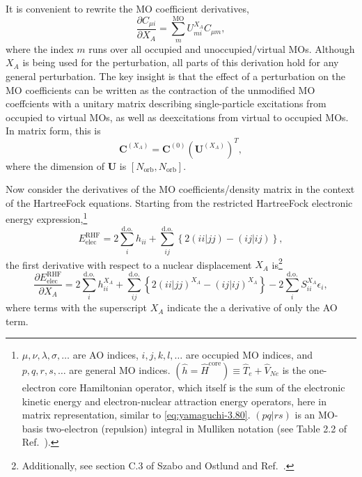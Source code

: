 \documentclass[%
class = book,%
crop = false,%
float = true,%
multi = true,%
preview = false,%
]{standalone}
\let\cite\autocite
\newcommand\hf{Hartree\textendash{}Fock}
\begin{document}
It is convenient to rewrite the MO coefficient derivatives,
\begin{equation}
  \tag{Yamaguchi eq. 3.7}
  \frac{\partial C_{\mu i}}{\partial X_{A}} = \sum_{m}^{\text{MO}} U_{mi}^{X_{A}} C_{\mu m},
\end{equation}
where the index \(m\) runs over all occupied and unoccupied/virtual MOs. Although \(X_{A}\) is being used for the perturbation, all parts of this derivation hold for any general perturbation. The key insight is that the effect of a perturbation on the MO coefficients can be written as the contraction of the unmodified MO coeffcients with a unitary matrix describing single-particle excitations from occupied to virtual MOs, as well as deexcitations from virtual to occupied MOs. In matrix form, this is
\begin{equation}
  \mathbf{C}^{(X_{A})} = \mathbf{C}^{(0)} \left( \mathbf{U}^{(X_{A})} \right)^{T},
\end{equation}
where the dimension of \(\mathbf{U}\) is \([N_{\text{orb}}, N_{\text{orb}}]\).

Now consider the derivatives of the MO coefficients/density matrix in the context of the \hf{} equations. Starting from the restricted \hf{} electronic energy expression,\footnote{\(\mu,\nu,\lambda,\sigma,\dots\) are AO indices, \(i,j,k,l,\dots\) are occupied MO indices, and \(p,q,r,s,\dots\) are general MO indices. \(\left(\hat{h} = \hat{H}^{\text{core}} \right) \equiv \hat{T}_{e} + \hat{V}_{Ne}\) is the one-electron core Hamiltonian operator, which itself is the sum of the electronic kinetic energy and electron-nuclear attraction energy operators, here in matrix representation, similar to \eqref{eq:yamaguchi-3.80}. \((pq|rs)\) is an MO-basis two-electron (repulsion) integral in Mulliken notation (see Table 2.2 of Ref.~\parencite{szabo1989modern}).}
\begin{equation}
  \label{eq:yamaguchi-4.1}\tag{Yamaguchi eq. 4.1}
  E_{\text{elec}}^{\text{RHF}} = 2 \sum_{i}^{\text{d.o.}} h_{ii} + \sum_{ij}^{\text{d.o.}} \left\{ 2(ii|jj) - (ij|ij) \right\},
\end{equation}
the first derivative with respect to a nuclear displacement \(X_{A}\) is\footnote{Additionally, see section C.3 of Szabo and Ostlund\cite{szabo1989modern} and Ref.~\parencite{Pople1979}.}
\begin{equation}
  \label{eq:yamaguchi-4.21}\tag{Yamaguchi eq. 4.21}
  \frac{\partial E_{\text{elec}}^{\text{RHF}}}{\partial X_{A}} = 2 \sum_{i}^{\text{d.o.}} h_{ii}^{X_{A}} + \sum_{ij}^{\text{d.o.}} \left\{ 2(ii|jj)^{X_{A}} - (ij|ij)^{X_{A}} \right\} - 2 \sum_{i}^{\text{d.o.}} S_{ii}^{X_{A}} \epsilon_{i},
\end{equation}
where terms with the superscript \(X_{A}\) indicate the a derivative of only the AO term.
\end{document}
